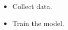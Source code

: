 \documentclass{article}
\begin{document}
\begin{itemize}
  \item Collect data.
  \item Train the model.
\end{itemize}
\end{document}

